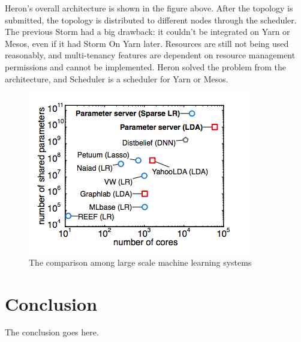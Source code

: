 \documentclass[journal]{IEEEtran}
\begin{document}
Heron's overall architecture is shown in the figure above. After the topology is submitted, the topology is distributed to different nodes through the scheduler. The previous Storm had a big drawback: it couldn't be integrated on Yarn or Mesos, even if it had Storm On Yarn later. Resources are still not being used reasonably, and multi-tenancy features are dependent on resource management permissions and cannot be implemented. Heron solved the problem from the architecture, and Scheduler is a scheduler for Yarn or Mesos.
\begin{figure}
\includegraphics[width=\linewidth]{comparison_parameter_servers.png}
\caption{The comparison among large scale machine learning systems}
\label{comparison_parameter_servers}
\end{figure}

\section{Conclusion}
The conclusion goes here.





\end{document}
